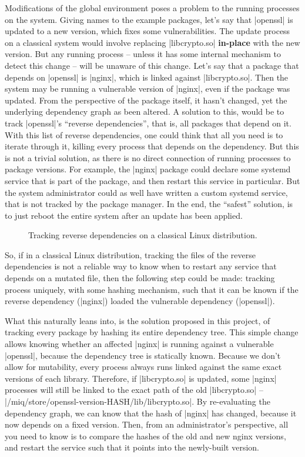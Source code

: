 Modifications of the global environment poses a problem
to the running processes on the system. Giving names to the
example packages, let's say that |openssl| is updated to a
new version, which fixes some vulnerabilities. The update
process on a classical system would involve replacing
|libcrypto.so| \textbf{in-place} with the new version. But
any running process -- unless it has some internal mechanism
to detect this change -- will be unaware of this change.
Let's say that a package that depends on |openssl| is
|nginx|, which is linked against |libcrypto.so|. Then the
system may be running a vulnerable version of |nginx|, even
if the package was updated. From the perspective of the
package itself, it hasn't changed, yet the underlying
dependency graph as been altered. A solution to this, would
be to track |openssl|'s ``reverse dependencies'', that is,
all packages that depend on it. With this list of reverse
dependencies, one could think that all you need is to
iterate through it, killing every process that depends on
the dependency. But this is not a trivial solution, as there
is no direct connection of running processes to package
versions. For example, the |nginx| package could declare
some systemd service that is part of the package, and then
restart this service in particular. But the system
administrator could as well have written a custom systemd
service, that is not tracked by the package manager. In the
end, the ``safest'' solution, is to just reboot the entire
system after an update has been applied.

\begin{figure}[htb]
    \centerfloat
    
    \caption{Tracking reverse dependencies on a classical Linux distribution.}
    \label{fig:nginx_classic}
\end{figure}


So, if in a classical Linux distribution, tracking the files
of the reverse dependencies is not a reliable way to know
when to restart any service that depends on a mutated file,
then the following step could be made: tracking process
uniquely, with some hashing mechanism, such that it can be
known if the reverse dependency (|nginx|) loaded the
vulnerable dependency (|openssl|).


What this naturally leans into, is the solution proposed in this project, of tracking
every package by hashing its entire dependency tree. This
simple change allows knowing whether an affected |nginx| is
running against a vulnerable |openssl|, because the
dependency tree is statically known. Because we don't allow
for mutability, every process always runs linked against the
same exact versions of each library. Therefore, if
|libcrypto.so| is updated, some |nginx| processes will still
be linked to the exact path of the old |libcrypto.so| --
|/miq/store/openssl-version-HASH/lib/libcrypto.so|. By
re-evaluating the dependency graph, we can know that the
hash of |nginx| has changed, because it now depends on a
fixed version. Then, from an administrator's perspective,
all you need to know is to compare the hashes of the old and
new nginx versions, and restart the service such that it
points into the newly-built version.

